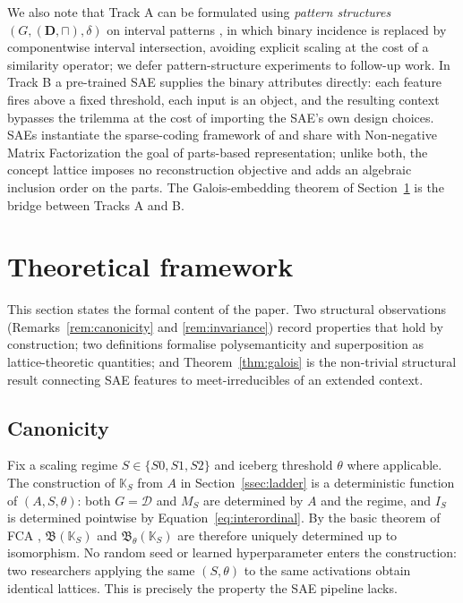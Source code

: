 \documentclass[a4paper,fleqn]{cas-dc}
\newcommand{\D}{\mathcal{D}}
\newcommand{\K}{\mathbb{K}}
\newcommand{\Lat}{\mathfrak{B}}
\begin{document}
We also note that Track A can be formulated using \emph{pattern structures} $(G, (\mathbf{D}, \sqcap), \delta)$ on interval patterns \citep{ganterkuznetsov2001pattern,kaytoue2011mining}, in which binary incidence is replaced by componentwise interval intersection, avoiding explicit scaling at the cost of a similarity operator; we defer pattern-structure experiments to follow-up work.
In Track B a pre-trained SAE supplies the binary attributes directly: each feature fires above a fixed threshold, each input is an object, and the resulting context bypasses the trilemma at the cost of importing the SAE's own design choices.
SAEs instantiate the sparse-coding framework of \citet{olshausen1997sparse} and share with Non-negative Matrix Factorization \citep{lee1999learning} the goal of parts-based representation; unlike both, the concept lattice imposes no reconstruction objective and adds an algebraic inclusion order on the parts.
The Galois-embedding theorem of Section~\ref{sec:theory} is the bridge between Tracks A and B.

\section{Theoretical framework}\label{sec:theory}

This section states the formal content of the paper.
Two structural observations (Remarks~\ref{rem:canonicity} and \ref{rem:invariance}) record properties that hold by construction; two definitions formalise polysemanticity and superposition as lattice-theoretic quantities; and Theorem~\ref{thm:galois} is the non-trivial structural result connecting SAE features to meet-irreducibles of an extended context.

\subsection{Canonicity}

\begin{remark}\label{rem:canonicity}
Fix a scaling regime $S \in \{S0, S1, S2\}$ and iceberg threshold $\theta$ where applicable.
The construction of $\K_S$ from $A$ in Section~\ref{ssec:ladder} is a deterministic function of $(A, S, \theta)$: both $G = \D$ and $M_S$ are determined by $A$ and the regime, and $I_S$ is determined pointwise by Equation~\eqref{eq:interordinal}.
By the basic theorem of FCA \citep{wille1982restructuring}, $\Lat(\K_S)$ and $\Lat_\theta(\K_S)$ are therefore uniquely determined up to isomorphism.
No random seed or learned hyperparameter enters the construction: two researchers applying the same $(S, \theta)$ to the same activations obtain identical lattices.
This is precisely the property the SAE pipeline lacks.
\end{remark}
\end{document}
